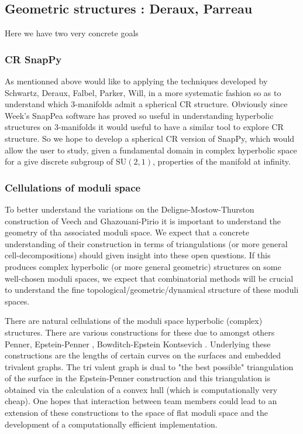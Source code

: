 \documentclass[14pt,fleqn]{article}
\begin{document}
\subsection{Geometric structures
{\normalfont : Deraux, Parreau}
}

Here we have two very concrete goals

\subsubsection{CR SnapPy}
As mentionned above would like to applying the  techniques developed 
by Schwartz, Deraux, Falbel, Parker, Will, in a
more systematic fashion so as to understand
which 3-manifolds admit a spherical CR structure.
Obviously since Week's SnapPea software 
has proved so useful in understanding 
hyperbolic structures on 3-manifolds
it would useful to have a similar tool
to explore CR structure.
So we hope to develop a spherical CR version of SnapPy,
which would allow the user to study, 
given a fundamental domain 
in complex hyperbolic space  for a
give discrete subgroup of $\mathrm{SU}(2,1)$, properties of the  manifold at infinity.


\subsubsection{Cellulations of moduli space}
\label{cells flat}
To better understand the variations 
on the Deligne-Mostow-Thurston construction
of  Veech and Ghazouani-Pirio
it is important to understand the geometry
of tha associated moduli space.
We expect that a concrete understanding of their construction in terms of triangulations (or more general cell-decompositions) should given
insight into these open questions. 
If this produces complex hyperbolic
(or more general geometric) structures on some well-chosen moduli spaces, we expect that combinatorial methods will be crucial to understand the fine topological/geometric/dynamical structure of these
moduli spaces.

There are  natural cellulations of 
the moduli space hyperbolic (complex)  structures.
There are various constructions for these
due to amongst others Penner, 
Epstein-Penner \cite{epstein1988}, 
Bowditch-Epstein \cite{BOWDITCH198891} Kontsevich \cite{kontsevich1992}.
Underlying these constructions 
are the lengths of certain curves on the surfaces
and embedded trivalent graphs.
The tri valent graph is dual to 
"the best possible" triangulation of the surface
in the Epstein-Penner construction
and this triangulation is obtained 
via the calculation of a convex hull
(which is computationally very cheap).
One hopes that interaction between team members
could lead to an extension of these constructions
to the space of flat moduli space 
and the development of a computationally efficient implementation.
 
\end{document}
